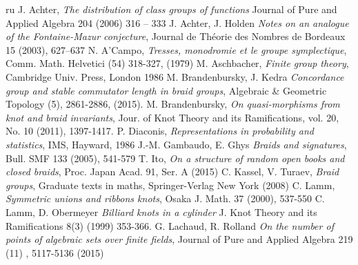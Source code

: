 \documentclass[10pt,a4paper]{amsart}
\begin{document}
	 \begin{thebibliography}{ru}
	 	 J. Achter, {\it The distribution of class groups of functions} Journal of Pure and Applied Algebra 204 (2006) 316 – 333
	 	 J. Achter, J. Holden {\it Notes on an analogue of the Fontaine-Mazur
	 	conjecture}, Journal de Th\'eorie des Nombres de Bordeaux 15 (2003), 627–637
	 	 N. A'Campo, {\it Tresses, monodromie et le groupe symplectique}, Comm. Math. Helvetici (54) 
	 	318-327, (1979)
	 	  M. Aschbacher, {\it Finite group theory}, Cambridge Univ. Press, London 1986
	 	  M. Brandenbursky, J. Kedra {\it Concordance group and stable commutator length in braid groups}, Algebraic \& Geometric Topology (5), 2861-2886, (2015).
	 	  M. Brandenbursky, {\it On quasi-morphisms from knot and braid invariants}, Jour. of Knot Theory and its Ramifications, vol. 20, No. 10 (2011), 1397-1417.
	 	  P. Diaconis, {\it Representations in probability and statistics}, IMS, Hayward, 1986
	 	  J.-M. Gambaudo, E. Ghys {\it Braids and signatures}, Bull. SMF 133 (2005), 541-579
	 	  T. Ito, {\it On a structure of random open books and closed braids}, Proc. Japan Acad. 91, Ser. A (2015) 
 	 C. Kassel, V. Turaev, {\it Braid groups}, Graduate texts in maths, Springer-Verlag New York (2008)
  C. Lamm, {\it Symmetric unions and ribbons knots}, Osaka  J. Math. 37  (2000),  537-550
 		 C.  Lamm, D. Obermeyer {\it Billiard knots in a cylinder} J. Knot Theory and its Ramifications 8(3) (1999) 353-366.
 		 G. Lachaud, R. Rolland {\it On the number of points of algebraic sets over finite fields}, Journal of Pure and Applied Algebra
 		219 (11) ,  5117-5136 (2015)


\end{thebibliography}
\end{document}
